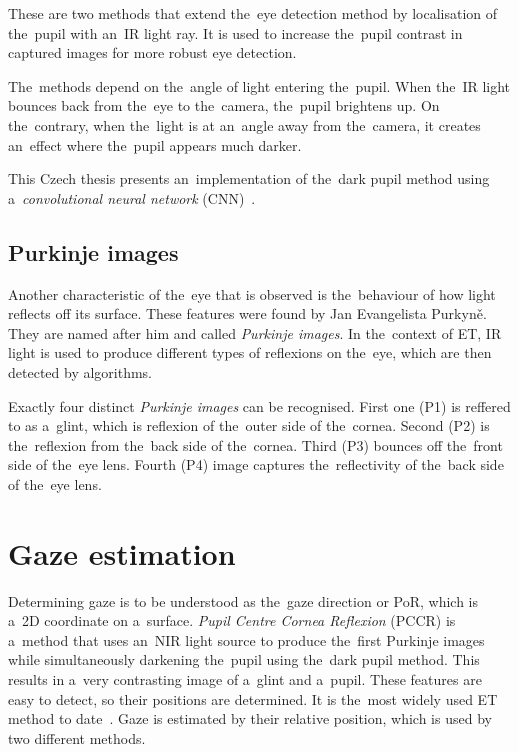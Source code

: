 These are two methods that extend the~eye detection method by localisation of the~pupil with an~IR light ray. It is used to increase the~pupil contrast in captured images for more robust eye detection.

The~methods depend on the~angle of light entering the~pupil. When the~IR light bounces back from the~eye to the~camera, the~pupil brightens up. On the~contrary, when the~light is at an~angle away from the~camera, it creates an~effect where the~pupil appears much darker. 

This Czech thesis presents an~implementation of the~dark pupil method using a~\emph{convolutional neural network} (CNN)~\cite{trnka2020thesis}.

\subsection{Purkinje images}
Another characteristic of the~eye that is observed is the~behaviour of how light reflects off its surface. These features were found by Jan Evangelista Purkyně. They are named after him and called \emph{Purkinje images}. In the~context of ET, IR light is used to produce different types of reflexions on the~eye, which are then detected by algorithms.

Exactly four distinct \emph{Purkinje images} can be recognised. First one (P1) is reffered to as a~glint, which is reflexion of the~outer side of the~cornea. Second (P2) is the~reflexion from the~back side of the~cornea. Third (P3) bounces off the~front side of the~eye lens. Fourth (P4) image captures the~reflectivity of the~back side of the~eye lens.~\cite{ugwitz2020thesis}

\pagebreak{}

\section{Gaze estimation}
\label{sec:gaze-estimation}
Determining gaze is to be understood as the~gaze direction or PoR, which is a~2D coordinate on a~surface. \emph{Pupil Centre Cornea Reflexion} (PCCR) is a~method that uses an~NIR light source to produce the~first Purkinje images while simultaneously darkening the~pupil using the~dark pupil method. This results in a~very contrasting image of a~glint and a~pupil. These features are easy to detect, so their positions are determined. It is the~most widely used ET method to date~\cite{tobii-eye-trackers}. Gaze is estimated by their relative position, which is used by two different methods.~\cite{cognolato2018}

